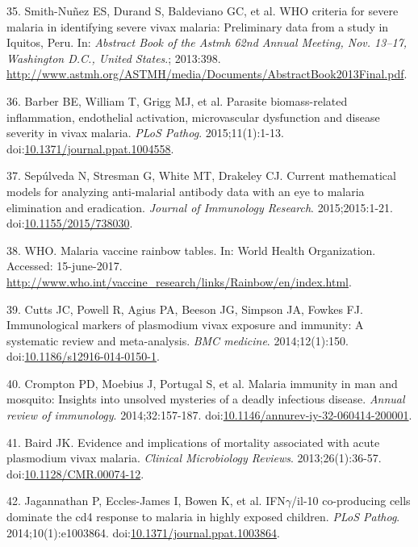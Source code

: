 \documentclass[]{article}
\begin{document}
\hypertarget{ref-smith2013}{}
35. Smith-Nuñez ES, Durand S, Baldeviano GC, et al. WHO criteria for
severe malaria in identifying severe vivax malaria: Preliminary data
from a study in Iquitos, Peru. In: \emph{Abstract Book of the Astmh 62nd
Annual Meeting, Nov. 13--17, Washington D.C., United States}.; 2013:398.
\url{http://www.astmh.org/ASTMH/media/Documents/AbstractBook2013Final.pdf}.

\hypertarget{ref-barber2015}{}
36. Barber BE, William T, Grigg MJ, et al. Parasite biomass-related
inflammation, endothelial activation, microvascular dysfunction and
disease severity in vivax malaria. \emph{PLoS Pathog}. 2015;11(1):1-13.
doi:\href{https://doi.org/10.1371/journal.ppat.1004558}{10.1371/journal.ppat.1004558}.

\hypertarget{ref-sepulveda2015}{}
37. Sepúlveda N, Stresman G, White MT, Drakeley CJ. Current mathematical
models for analyzing anti-malarial antibody data with an eye to malaria
elimination and eradication. \emph{Journal of Immunology Research}.
2015;2015:1-21.
doi:\href{https://doi.org/10.1155/2015/738030}{10.1155/2015/738030}.

\hypertarget{ref-rainbow2016}{}
38. WHO. Malaria vaccine rainbow tables. In: World Health Organization.
Accessed: 15-june-2017.
\url{http://www.who.int/vaccine_research/links/Rainbow/en/index.html}.

\hypertarget{ref-cutts2014meta}{}
39. Cutts JC, Powell R, Agius PA, Beeson JG, Simpson JA, Fowkes FJ.
Immunological markers of plasmodium vivax exposure and immunity: A
systematic review and meta-analysis. \emph{BMC medicine}.
2014;12(1):150.
doi:\href{https://doi.org/10.1186/s12916-014-0150-1}{10.1186/s12916-014-0150-1}.

\hypertarget{ref-crompton2014rev}{}
40. Crompton PD, Moebius J, Portugal S, et al. Malaria immunity in man
and mosquito: Insights into unsolved mysteries of a deadly infectious
disease. \emph{Annual review of immunology}. 2014;32:157-187.
doi:\href{https://doi.org/10.1146/annurev-iy-32-060414-200001}{10.1146/annurev-iy-32-060414-200001}.

\hypertarget{ref-baird2013}{}
41. Baird JK. Evidence and implications of mortality associated with
acute plasmodium vivax malaria. \emph{Clinical Microbiology Reviews}.
2013;26(1):36-57.
doi:\href{https://doi.org/10.1128/CMR.00074-12}{10.1128/CMR.00074-12}.

\hypertarget{ref-jagannathan2014}{}
42. Jagannathan P, Eccles-James I, Bowen K, et al. IFN\(\gamma\)/il-10
co-producing cells dominate the cd4 response to malaria in highly
exposed children. \emph{PLoS Pathog}. 2014;10(1):e1003864.
doi:\href{https://doi.org/10.1371/journal.ppat.1003864}{10.1371/journal.ppat.1003864}.
\end{document}
